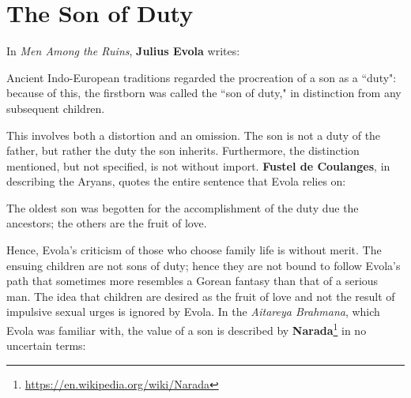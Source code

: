 \section{The Son of Duty}

In \emph{Men Among the Ruins}, \textbf{Julius Evola} writes:

\begin{quotex}
Ancient Indo-European traditions regarded the procreation of a son as a ``duty": because of this, the firstborn was called the ``son of duty," in distinction from any subsequent children. 

\end{quotex}
This involves both a distortion and an omission. The son is not a duty of the father, but rather the duty the son inherits. Furthermore, the distinction mentioned, but not specified, is not without import. \textbf{Fustel de Coulanges}, in describing the Aryans, quotes the entire sentence that Evola relies on:

\begin{quotex}
The oldest son was begotten for the accomplishment of the duty due the ancestors; the others are the fruit of love. 

\end{quotex}
Hence, Evola's criticism of those who choose family life is without merit. The ensuing children are not sons of duty; hence they are not bound to follow Evola's path that sometimes more resembles a Gorean fantasy than that of a serious man. The idea that children are desired as the fruit of love and not the result of impulsive sexual urges is ignored by Evola. In the \emph{Aitareya Brahmana}, which Evola was familiar with, the value of a son is described by \textbf{Narada}\footnote{\url{https://en.wikipedia.org/wiki/Narada}} in no uncertain terms:

